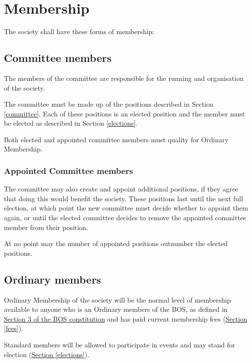 \documentclass{report}
\newcommand{\sref}[1]{\hyperref[#1]{Section \ref*{#1}}}
\begin{document}
\section{Membership}

The society shall have these forms of membership:
	
	\subsection{Committee members}
	\label{member_committee}
	
	The members of the committee are responsible for the running and organisation of the society.
	
	The committee must be made up of the positions described in Section \ref{committee}. Each of these positions is an elected position and the member must be elected as described in Section \ref{elections}.	
	
	Both elected and appointed committee members must quality for Ordinary Membership.
	
		\subsubsection{Appointed Committee members}
		
		The committee may also create and appoint additional positions, if they agree that doing this would benefit the society. These positions last until the next full election, at which point the new committee must decide whether to appoint them again, or until the elected committee decides to remove the appointed committee member from their position.
		
		At no point may the number of appointed positions outnumber the elected positions.
	
	\subsection{Ordinary members}
	\label{member_ordinary}
	
	Ordinary Membership of the society will be the normal level of membership available to anyone who is an Ordinary members of the BOS, as defined in \href{http://www.aberguild.co.uk/en/sports-a-activities/societies/bos-constitution}{Section 3 of the BOS constitution} and has paid current membership fees (\sref{fees}).
	
	Standard members will be allowed to participate in events and may stand for election (\sref{elections}).
\end{document}
